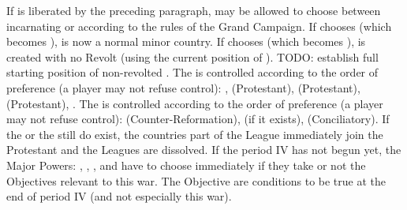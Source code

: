 \begin{digressions}
  \label{pIV:TYW:VEN transfer} If
  \payshollande is liberated by the preceding paragraph, \VEN may be allowed
  to choose between incarnating \AUS or \HOL according to the rules of the
  Grand Campaign.
  \bparag If \VEN chooses \AUSMin (which becomes \AUS), \payshollande is now a
  normal minor country.
  \bparag If \VEN chooses \HOLmin (which becomes \HOL), \HOL is created with
  no Revolt (using the current position of \HOLmin).
  \bparag TODO: establish full starting position of non-revolted \HOL.
  \aparag The \alliance is controlled according to the order of preference (a
  player may not refuse control): \HOL, \ENG (Protestant), \FRA (Protestant),
  \SUE (Protestant), \RUS.
  \aparag The \ligue is controlled according to the order of preference (a
  player may not refuse control): \SPA (Counter-Reformation), \AUS (if it
  exists), \SPA (Conciliatory).
  \aparag If the  or the  still do exist, the countries part of the League immediately join
  the Protestant \alliance and the Leagues are dissolved.
  \aparag If the period IV has not begun yet, the Major Powers: \SPA, \HOL,
  \SUE, \FRA and \AUT have to choose immediately if they take or not the
  Objectives relevant to this war. The Objective are conditions to be true at
  the end of period IV (and not especially this war).



\end{digressions}

